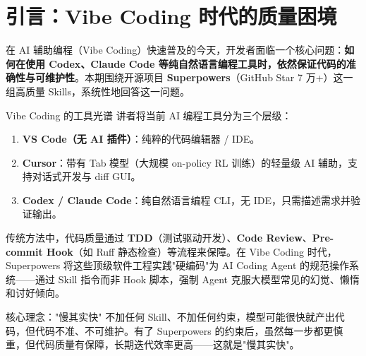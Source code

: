 \section{引言：Vibe Coding 时代的质量困境}

在 AI 辅助编程（Vibe Coding）快速普及的今天，开发者面临一个核心问题：\textbf{如何在使用 Codex、Claude Code 等纯自然语言编程工具时，依然保证代码的准确性与可维护性}。本期围绕开源项目 \textbf{Superpowers}（GitHub Star 7 万+）这一组高质量 Skills，系统性地回答这一问题。

\begin{knowledgebox}{Vibe Coding 的工具光谱}
讲者将当前 AI 编程工具分为三个层级：
\begin{enumerate}
    \item \textbf{VS Code（无 AI 插件）}：纯粹的代码编辑器 / IDE。
    \item \textbf{Cursor}：带有 Tab 模型（大规模 on-policy RL 训练）的轻量级 AI 辅助，支持对话式开发与 diff GUI。
    \item \textbf{Codex / Claude Code}：纯自然语言编程 CLI，无 IDE，只需描述需求并验证输出。
\end{enumerate}
\end{knowledgebox}

传统方法中，代码质量通过 \textbf{TDD}（测试驱动开发）、\textbf{Code Review}、\textbf{Pre-commit Hook}（如 Ruff 静态检查）等流程来保障。在 Vibe Coding 时代，Superpowers 将这些顶级软件工程实践"硬编码"为 AI Coding Agent 的规范操作系统——通过 Skill 指令而非 Hook 脚本，强制 Agent 克服大模型常见的幻觉、懒惰和讨好倾向。

\begin{importantbox}{核心理念："慢其实快"}
不加任何 Skill、不加任何约束，模型可能很快就产出代码，但代码不准、不可维护。有了 Superpowers 的约束后，虽然每一步都更慎重，但代码质量有保障，长期迭代效率更高——这就是"慢其实快"。
\end{importantbox}


